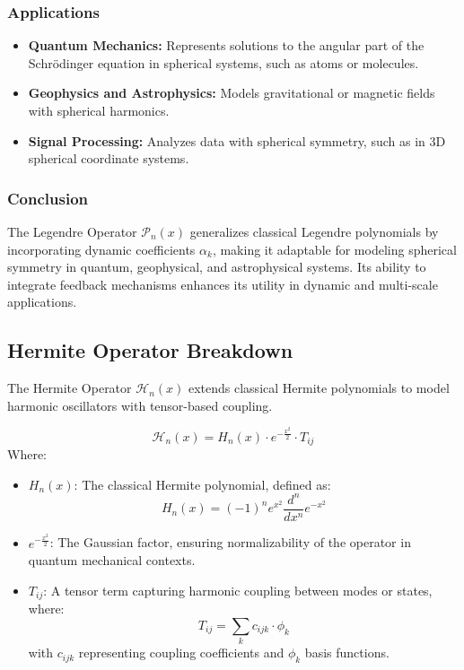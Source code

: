 \documentclass{article}
\theoremstyle{plain}
\begin{document}
\begin{itemize}
\subsubsection*{Applications}
\begin{itemize}
    \item \textbf{Quantum Mechanics:} Represents solutions to the angular part of the Schrödinger equation in spherical systems, such as atoms or molecules.
    \item \textbf{Geophysics and Astrophysics:} Models gravitational or magnetic fields with spherical harmonics.
    \item \textbf{Signal Processing:} Analyzes data with spherical symmetry, such as in 3D spherical coordinate systems.
\end{itemize}

\subsubsection*{Conclusion}
The Legendre Operator \( \mathcal{P}_n(x) \) generalizes classical Legendre polynomials by incorporating dynamic coefficients \( \alpha_k \), making it adaptable for modeling spherical symmetry in quantum, geophysical, and astrophysical systems. Its ability to integrate feedback mechanisms enhances its utility in dynamic and multi-scale applications.


\subsection{Hermite Operator Breakdown}

The Hermite Operator \( \mathcal{H}_n(x) \) extends classical Hermite polynomials to model harmonic oscillators with tensor-based coupling.

\[
\mathcal{H}_n(x) = H_n(x) \cdot e^{-\frac{x^2}{2}} \cdot T_{ij}
\]
Where:
\begin{itemize}
    \item \( H_n(x) \): The classical Hermite polynomial, defined as:
    \[
    H_n(x) = (-1)^n e^{x^2} \frac{d^n}{dx^n} e^{-x^2}
    \]
    \item \( e^{-\frac{x^2}{2}} \): The Gaussian factor, ensuring normalizability of the operator in quantum mechanical contexts.
    \item \( T_{ij} \): A tensor term capturing harmonic coupling between modes or states, where:
    \[
    T_{ij} = \sum_{k} c_{ijk} \cdot \phi_k
    \]
    with \( c_{ijk} \) representing coupling coefficients and \( \phi_k \) basis functions.
\end{itemize}


\end{itemize}
\end{document}
